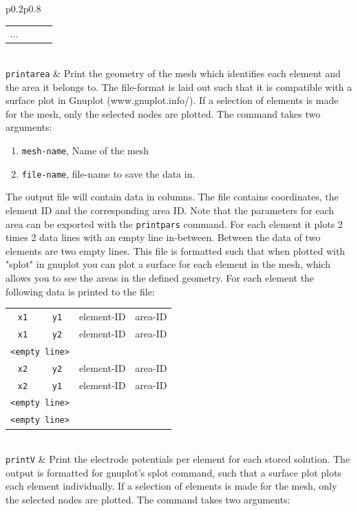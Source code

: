 \documentclass[noshowpacs,preprintnumbers,amsmath,amssymb, letter]{revtex4}
\begin{document}
\begin{longtable}{p{}p{}}
\begin{tabular}{cccc}
	... \\
\end{tabular}\\
\texttt{printarea}	& Print the geometry of the mesh which identifies each element and the area it belongs to. The file-format is laid out such that it is compatible with a surface plot in Gnuplot (www.gnuplot.info/).  If a selection of elements is made for the mesh, only the selected nodes are plotted. The command takes two arguments:
\begin{enumerate}
\item \texttt{mesh-name}, Name of the mesh
\item \texttt{file-name}, file-name to save the data in.
\end{enumerate}
The output file will contain data in columns. The file contains coordinates, the element ID and the corresponding area ID. Note that the parameters for each area can be exported with  the \texttt{printpars} command. For each element it plots 2 times 2 data lines with an empty line in-between. Between the data of two elements are two empty lines. This file is formatted such that when plotted with "splot" in gnuplot you can plot a surface for each element in the mesh, which allows you to see the areas in the defined geometry. For each element the following data is printed to the file:\newline 
\begin{tabular}{cccc}
	\texttt{x1} & \texttt{y1} & element-ID & area-ID\\
	\texttt{x1} & \texttt{y2} & element-ID & area-ID \\
	\multicolumn{2}{l}{\texttt{<empty line>}}\\
	\texttt{x2} & \texttt{y2} & element-ID & area-ID \\
	\texttt{x2} & \texttt{y1} & element-ID & area-ID \\
	\multicolumn{2}{l}{\texttt{<empty line>}}\\
	\multicolumn{2}{l}{\texttt{<empty line>}}\\
\end{tabular}\\
\texttt{printV}		& Print the electrode potentials per element for each stored solution. The output is formatted for gnuplot's splot command, such that a surface plot plots each element individually. If a selection of elements is made for the mesh, only the selected nodes are plotted. The command takes two arguments:

\end{longtable}
\end{document}
